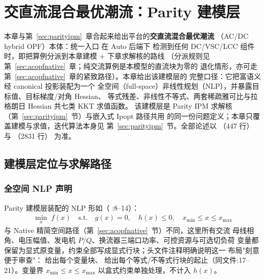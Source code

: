 \section{交直流混合最优潮流：Parity 建模层}\label{sec:parityform}

本章与第~\ref{sec:parityipm}~章合起来给出平台的\textbf{交直流混合最优潮流}
（AC/DC hybrid OPF）本体：统一入口  在 Auto 后端下
检测到任何 DC/VSC/LCC 组件时，即把算例分派到本章建模 + 下章求解核的路线
（分派规则见第~\ref{sec:acopfnative}~章；纯交流算例是本模型的直流块为零的
退化情形，亦可走第~\ref{sec:acopfnative}~章的紧致路径）。本章给出该建模层的
完整口径：它把富语义  经 canonical 投影装配为一个
全空间（full-space）非线性规划（NLP），并暴露目标值、目标梯度/对角 Hessian、
等式残差、非线性不等式、两套稀疏雅可比与拉格朗日 Hessian 共七类 KKT 求值函数。
该建模层是 Parity IPM 求解核（第~\ref{sec:parityipm}~节）与嵌入式 Ipopt 路径共用
的同一份问题定义；本章只覆盖建模与求值，迭代算法本身见
第~\ref{sec:parityipm}~节。全部论述以
（447 行）
与 （2831 行）
为准。

\subsection{建模层定位与求解路径}

\subsubsection*{全空间 NLP 声明}
Parity 建模层装配的 NLP 形如（
:8--14）：
\begin{align*}
\min_{x}\; f(x)\quad
\text{s.t.}\quad g(x)=0,\quad h(x)\le 0,\quad
x_{\min}\le x\le x_{\max}
\end{align*}
与 Native 精简空间路径（第~\ref{sec:acopfnative}~节）不同，这里所有交流
母线相角、电压幅值、发电机 $P/Q$、换流器三端口功率、可控资源与可选切负荷
变量都保留为显式原变量，约束全部写成显式行块；头文件注释明确说明这一
布局"刻意便于审查"： 给出每个变量块、
给出每个等式/不等式行块的起止（同文件:17--21）。变量界
$x_{\min}\le x\le x_{\max}$ 以盒式约束单独处理，不计入 $h(x)$。

